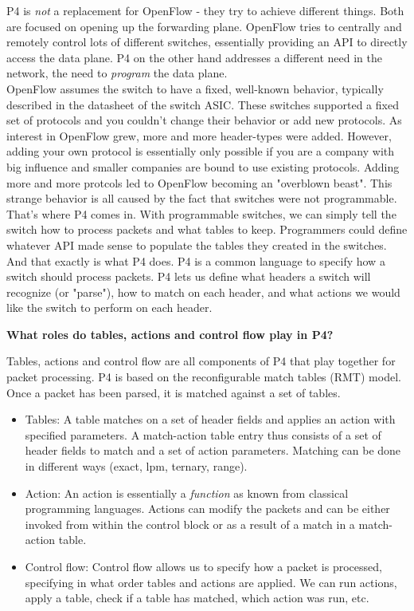 \documentclass[11pt,oneside,a4paper]{article}
\begin{document}
\noindent  P4 is \textit{not} a replacement for OpenFlow - they try to achieve different things. Both are focused on opening up the forwarding plane. OpenFlow tries to centrally and remotely control lots of different switches, essentially providing an API to directly access the data plane. P4 on the other hand addresses a different need in the network, the need to \textit{program} the data plane.\\
OpenFlow assumes the switch to have a fixed, well-known behavior, typically described in the datasheet of the switch ASIC. These switches supported a fixed set of protocols and you couldn't change their behavior or add new protocols. As interest in OpenFlow grew, more and more header-types were added. However, adding your own protocol is essentially only possible if you are a company with big influence and smaller companies are bound to use existing protocols. Adding more and more protcols led to OpenFlow becoming an "overblown beast". This strange behavior is all caused by the fact that switches were not programmable.\\
That's where P4 comes in. With programmable switches, we can simply tell the switch how to process packets and what tables to keep. Programmers could define whatever API made sense to populate the tables they created in the switches. And that exactly is what P4 does. P4 is a common language to specify how a switch should process packets. P4 lets us define what headers a switch will recognize (or "parse"), how to match on each header, and what actions we would like the switch to perform on each header.\\

\newpage

\noindent \textbf{What roles do tables, actions and control flow play in P4?}

Tables, actions and control flow are all components of P4 that play together for packet processing. P4 is based on the reconfigurable match tables (RMT) model. Once a packet has been parsed, it is matched against a set of tables. 

\vspace{-\topsep}
\begin{itemize}
	\setlength{\itemsep}{0pt}
	\setlength{\parskip}{0pt}
	\item Tables: A table matches on a set of header fields and applies an action with specified parameters. A match-action table entry thus consists of a set of header fields to match and a set of action parameters. Matching can be done in different ways (exact, lpm, ternary, range).
	\item Action: An action is essentially a \textit{function} as known from classical programming languages. Actions can modify the packets and can be either invoked from within the control block or as a result of a match in a match-action table.
	\item Control flow: Control flow allows us to specify how a packet is processed, specifying in what order tables and actions are applied. We can run actions, apply a table, check if a table has matched, which action was run, etc.
\end{itemize}
\vspace{-\topsep}
\end{document}
